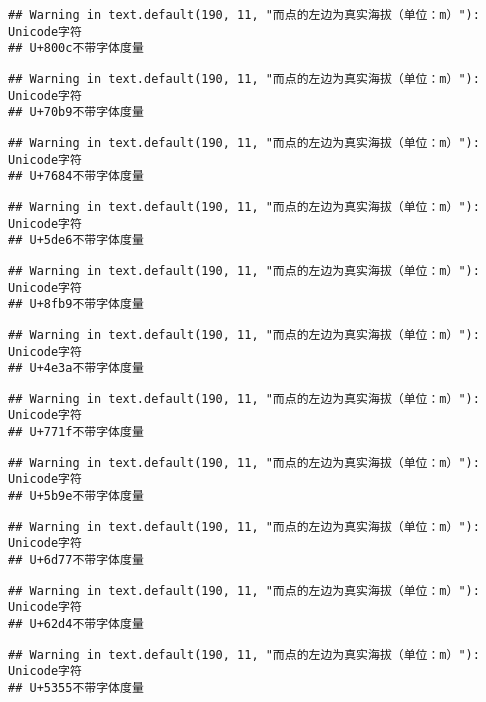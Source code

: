 \documentclass[
]{article}
\begin{document}
\begin{verbatim}
## Warning in text.default(190, 11, "而点的左边为真实海拔（单位：m）"): Unicode字符
## U+800c不带字体度量
\end{verbatim}

\begin{verbatim}
## Warning in text.default(190, 11, "而点的左边为真实海拔（单位：m）"): Unicode字符
## U+70b9不带字体度量
\end{verbatim}

\begin{verbatim}
## Warning in text.default(190, 11, "而点的左边为真实海拔（单位：m）"): Unicode字符
## U+7684不带字体度量
\end{verbatim}

\begin{verbatim}
## Warning in text.default(190, 11, "而点的左边为真实海拔（单位：m）"): Unicode字符
## U+5de6不带字体度量
\end{verbatim}

\begin{verbatim}
## Warning in text.default(190, 11, "而点的左边为真实海拔（单位：m）"): Unicode字符
## U+8fb9不带字体度量
\end{verbatim}

\begin{verbatim}
## Warning in text.default(190, 11, "而点的左边为真实海拔（单位：m）"): Unicode字符
## U+4e3a不带字体度量
\end{verbatim}

\begin{verbatim}
## Warning in text.default(190, 11, "而点的左边为真实海拔（单位：m）"): Unicode字符
## U+771f不带字体度量
\end{verbatim}

\begin{verbatim}
## Warning in text.default(190, 11, "而点的左边为真实海拔（单位：m）"): Unicode字符
## U+5b9e不带字体度量
\end{verbatim}

\begin{verbatim}
## Warning in text.default(190, 11, "而点的左边为真实海拔（单位：m）"): Unicode字符
## U+6d77不带字体度量
\end{verbatim}

\begin{verbatim}
## Warning in text.default(190, 11, "而点的左边为真实海拔（单位：m）"): Unicode字符
## U+62d4不带字体度量
\end{verbatim}

\begin{verbatim}
## Warning in text.default(190, 11, "而点的左边为真实海拔（单位：m）"): Unicode字符
## U+5355不带字体度量
\end{verbatim}
\end{document}
